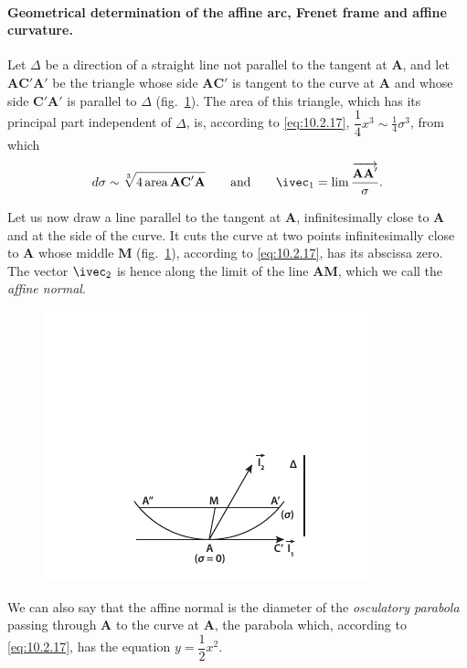 \paragraph{Geometrical determination of the affine arc, Frenet frame and affine curvature.}
\label{sec:140}
Let $\Delta$ be a direction of a straight line not parallel to the tangent at $\mathbf{A}$, and let $\mathbf{AC}'\mathbf{A}'$ be the triangle whose side $\mathbf{AC}'$ is tangent to the curve at $\mathbf{A}$ and whose side $\mathbf{C}'\mathbf{A}'$ is parallel to $\Delta$ (fig.~\ref{fig:5}). The area of this triangle, which has its principal part independent of $\Delta$, is, according to \eqref{eq:10.2.17}, $\dfrac{1}{4}x^{3}\sim\frac{1}{4}\sigma^{3}$, from which
\begin{equation}
  \label{eq:10.2.19}
  d\sigma\sim\sqrt[3]{4\,\text{area}\,\mathbf{AC}'\mathbf{A}} \qquad\text{and}\qquad\ivec_{1}=\lim\frac{\overrightarrow{\mathbf{AA}'}}{\sigma}.
\end{equation}

Let us now draw a line parallel to the tangent at $\mathbf{A}$, infinitesimally close to $\mathbf{A}$ and at the side of the curve. It cuts the curve at two points infinitesimally close to $\mathbf{A}$ whose middle $\mathbf{M}$ (fig.~\ref{fig:5}), according to \eqref{eq:10.2.17}, has its abscissa zero. The vector $\ivec_{2}$ is hence along the limit of the line $\mathbf{AM}$, which we call the \emph{affine normal}.
\begin{figure}[h]
  \centering
\includegraphics[scale=2]{cartangrp-f5}  
  \caption{}
  \label{fig:5}
\end{figure}

We can also say that the affine normal is the diameter of the \emph{osculatory parabola} passing through $\mathbf{A}$ to the curve at $\mathbf{A}$, the parabola which, according to \eqref{eq:10.2.17}, has the equation $y=\dfrac{1}{2}x^{2}$.

